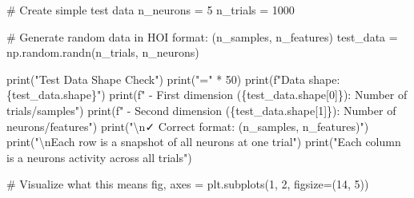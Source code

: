 \documentclass[
  11pt,
  letterpaper,
  oneside,
  openany]{book}
\newenvironment{Shaded}{\begin{snugshade}}{\end{snugshade}}
\newcommand{\BuiltInTok}[1]{\textcolor[rgb]{0.00,0.23,0.31}{#1}}
\newcommand{\CharTok}[1]{\textcolor[rgb]{0.13,0.47,0.30}{#1}}
\newcommand{\CommentTok}[1]{\textcolor[rgb]{0.37,0.37,0.37}{#1}}
\newcommand{\DecValTok}[1]{\textcolor[rgb]{0.68,0.00,0.00}{#1}}
\newcommand{\NormalTok}[1]{\textcolor[rgb]{0.00,0.23,0.31}{#1}}
\newcommand{\OperatorTok}[1]{\textcolor[rgb]{0.37,0.37,0.37}{#1}}
\newcommand{\SpecialCharTok}[1]{\textcolor[rgb]{0.37,0.37,0.37}{#1}}
\newcommand{\SpecialStringTok}[1]{\textcolor[rgb]{0.13,0.47,0.30}{#1}}
\newcommand{\StringTok}[1]{\textcolor[rgb]{0.13,0.47,0.30}{#1}}
\begin{document}
\begin{Shaded}
\begin{Highlighting}[]
\CommentTok{\# Create simple test data}
\NormalTok{n\_neurons }\OperatorTok{=} \DecValTok{5}
\NormalTok{n\_trials }\OperatorTok{=} \DecValTok{1000}

\CommentTok{\# Generate random data in HOI format: (n\_samples, n\_features)}
\NormalTok{test\_data }\OperatorTok{=}\NormalTok{ np.random.randn(n\_trials, n\_neurons)}

\BuiltInTok{print}\NormalTok{(}\StringTok{"Test Data Shape Check"}\NormalTok{)}
\BuiltInTok{print}\NormalTok{(}\StringTok{"="} \OperatorTok{*} \DecValTok{50}\NormalTok{)}
\BuiltInTok{print}\NormalTok{(}\SpecialStringTok{f"Data shape: }\SpecialCharTok{\{}\NormalTok{test\_data}\SpecialCharTok{.}\NormalTok{shape}\SpecialCharTok{\}}\SpecialStringTok{"}\NormalTok{)}
\BuiltInTok{print}\NormalTok{(}\SpecialStringTok{f"  {-} First dimension (}\SpecialCharTok{\{}\NormalTok{test\_data}\SpecialCharTok{.}\NormalTok{shape[}\DecValTok{0}\NormalTok{]}\SpecialCharTok{\}}\SpecialStringTok{): Number of trials/samples"}\NormalTok{)}
\BuiltInTok{print}\NormalTok{(}\SpecialStringTok{f"  {-} Second dimension (}\SpecialCharTok{\{}\NormalTok{test\_data}\SpecialCharTok{.}\NormalTok{shape[}\DecValTok{1}\NormalTok{]}\SpecialCharTok{\}}\SpecialStringTok{): Number of neurons/features"}\NormalTok{)}
\BuiltInTok{print}\NormalTok{(}\StringTok{"}\CharTok{\textbackslash{}n}\StringTok{✓ Correct format: (n\_samples, n\_features)"}\NormalTok{)}
\BuiltInTok{print}\NormalTok{(}\StringTok{"}\CharTok{\textbackslash{}n}\StringTok{Each row is a snapshot of all neurons at one trial"}\NormalTok{)}
\BuiltInTok{print}\NormalTok{(}\StringTok{"Each column is a neuron\textquotesingle{}s activity across all trials"}\NormalTok{)}

\CommentTok{\# Visualize what this means}
\NormalTok{fig, axes }\OperatorTok{=}\NormalTok{ plt.subplots(}\DecValTok{1}\NormalTok{, }\DecValTok{2}\NormalTok{, figsize}\OperatorTok{=}\NormalTok{(}\DecValTok{14}\NormalTok{, }\DecValTok{5}\NormalTok{))}


\end{Highlighting}
\end{Shaded}
\end{document}

